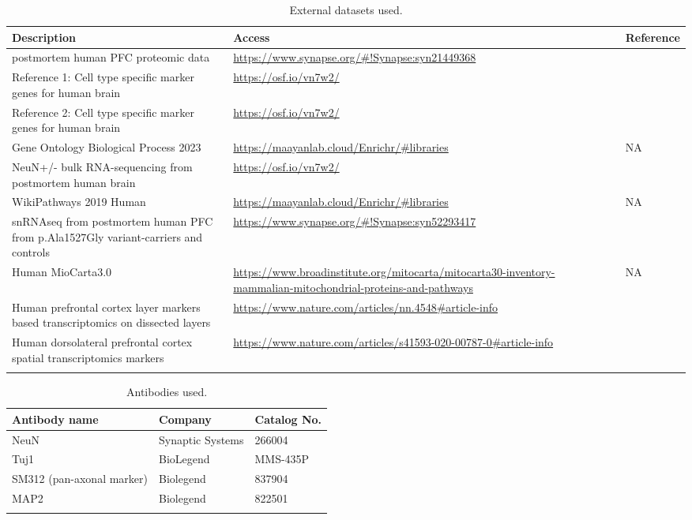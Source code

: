 \clearpage
\begin{longtable}{p{7cm} p{7cm} p{3cm}}
    \caption{External datasets used.}
    \hline
    \textbf{Description} & \textbf{Access} & \textbf{Reference} \\ 
    \hline
    \hline
    postmortem human PFC proteomic data & \url{https://www.synapse.org/\#!Synapse:syn21449368} & \cite{Johnson2020-ib} \\
    \hline
    Reference 1: Cell type specific marker genes for human brain & \url{https://osf.io/vn7w2/} & \cite{Wang2018-im} \\
    \hline
    Reference 2: Cell type specific marker genes for human brain & \url{https://osf.io/vn7w2/} & \cite{Franzen2019-hh} \\
    \hline
    Gene Ontology Biological Process 2023 & \url{https://maayanlab.cloud/Enrichr/\#libraries} & NA \\
    \hline
    NeuN+/- bulk RNA-sequencing from postmortem human brain & \url{https://osf.io/vn7w2/} & \cite{Welch2022-ef} \\
    \hline
    WikiPathways 2019 Human & \url{https://maayanlab.cloud/Enrichr/\#libraries} & NA \\
    \hline
    snRNAseq from postmortem human PFC from p.Ala1527Gly variant-carriers and controls & \url{https://www.synapse.org/\#!Synapse:syn52293417} & \cite{Mathys2023-rs} \\ 
    \hline
    Human MioCarta3.0 & \url{https://www.broadinstitute.org/mitocarta/mitocarta30-inventory-mammalian-mitochondrial-proteins-and-pathways} & NA \\
    \hline
    Human prefrontal cortex layer markers based transcriptomics on dissected layers & \url{https://www.nature.com/articles/nn.4548#article-info} & \cite{He2017-dq} \\
    \hline
    Human dorsolateral prefrontal cortex spatial transcriptomics markers & \url{https://www.nature.com/articles/s41593-020-00787-0#article-info} & \cite{Maynard2021-mz} \\
    \hline
    \label{tab:external_datasets}
\end{longtable}

\clearpage
\begin{longtable}{p{6cm} p{5cm} p{6cm}}
    \caption{Antibodies used.}
    \hline
    \textbf{Antibody name}                & \textbf{Company}      & \textbf{Catalog No.} \\
    \hline
    \hline
    NeuN                                  & Synaptic Systems      & 266004               \\
    \hline
    Tuj1                                  & BioLegend             & MMS-435P             \\
    \hline
    SM312 (pan-axonal marker)             & Biolegend             & 837904               \\
    \hline
    MAP2                                  & Biolegend             & 822501               \\
    \hline
    \label{tab:antibodies_used}
\end{longtable}

    
    